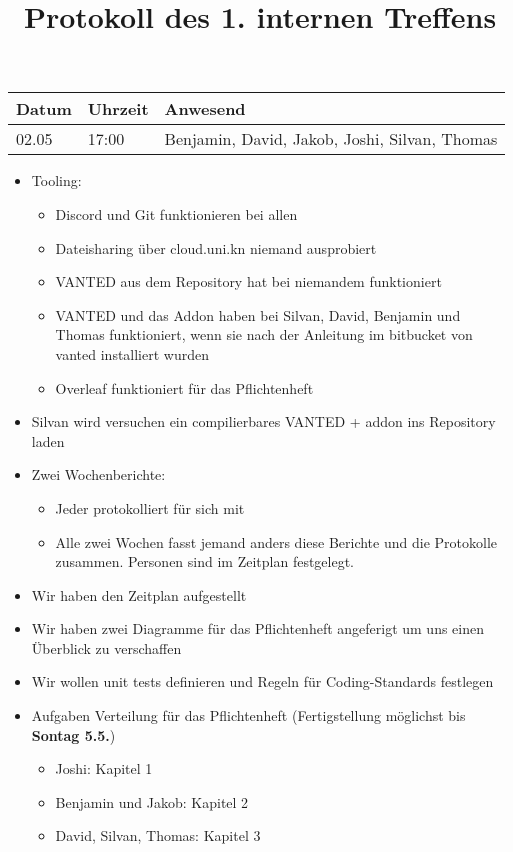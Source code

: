 \documentclass[]{article}
\date{}
\title{Protokoll des 1. internen
Treffens}
\providecommand{\tightlist}{%
  \setlength{\itemsep}{0pt}\setlength{\parskip}{0pt}}
\begin{document}
\maketitle

\begin{center}
\begin{tabular}{|l|l|l|}
\hline
Datum & Uhrzeit & Anwesend \\
\hline
02.05 & 17:00 & Benjamin, David, Jakob, Joshi, Silvan,
Thomas \\
\hline
\end{tabular}
\end{center}

\begin{itemize}
\item
  Tooling:
  \begin{itemize}
  \tightlist
  \item
    Discord und Git funktionieren bei allen
  \item
    Dateisharing über cloud.uni.kn niemand ausprobiert
  \item
    VANTED aus dem Repository hat bei niemandem funktioniert
  \item
    VANTED und das Addon haben bei Silvan, David, Benjamin und Thomas
    funktioniert, wenn sie nach der Anleitung im bitbucket von vanted
    installiert wurden
  \item
    Overleaf funktioniert für das Pflichtenheft
  \end{itemize}
\item
  Silvan wird versuchen ein compilierbares VANTED + addon ins Repository
  laden
\item
  Zwei Wochenberichte:
  \begin{itemize}
  \item
    Jeder protokolliert für sich mit
  \item
    Alle zwei Wochen fasst jemand anders diese Berichte und die Protokolle
  zusammen. Personen sind im Zeitplan festgelegt.
  \end{itemize}
\item
  Wir haben den Zeitplan aufgestellt
\item
  Wir haben zwei Diagramme für das Pflichtenheft angeferigt um uns einen
  Überblick zu verschaffen
\item
  Wir wollen unit tests definieren und Regeln für Coding-Standards
  festlegen
\item
  Aufgaben Verteilung für das Pflichtenheft (Fertigstellung möglichst
  bis \textbf{Sontag 5.5.})
  \begin{itemize}
  \item
  Joshi: Kapitel 1
\item
  Benjamin und Jakob: Kapitel 2
\item
  David, Silvan, Thomas: Kapitel 3
  \end{itemize}
\end{itemize}
\end{document}
